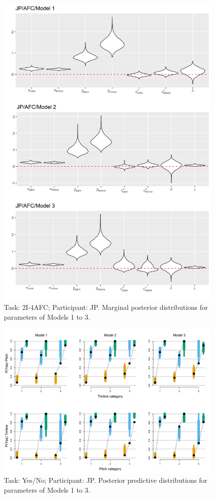\documentclass{article}\usepackage{knitr}
\begin{document}
\begin{figure}[H]
\centering
\includegraphics[scale=0.75, angle = 0]{Analysis_of_Human_Data/JP_AFC_Basic_models}
\caption{Task: 2I-4AFC; Participant: JP. Marginal posterior distributions for parameters of Models 1 to 3.}
\label{fig:JP_AFC_Basic_models}
\end{figure}

\begin{figure}[H]
\centering
\includegraphics[scale=0.75, angle = 270]{Analysis_of_Human_Data/JP_YN_post_pred}
\caption{Task: Yes/No; Participant: JP. Posterior predictive distributions for parameters of Models 1 to 3.}
\label{fig:JP_YN_post_pred}
\end{figure}
\end{document}
